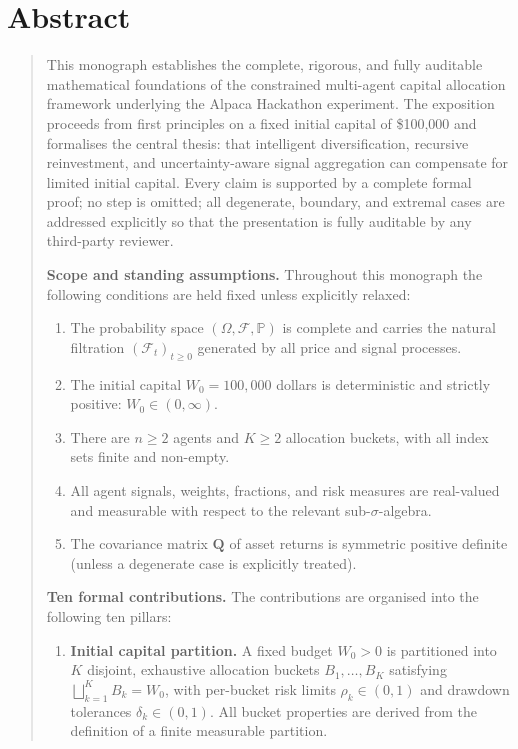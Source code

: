 \documentclass[12pt,openany]{book}
\newcommand{\bfQ}{\mathbf{Q}}
\numberwithin{equation}{chapter}
\theoremstyle{plain}
\theoremstyle{definition}
\theoremstyle{remark}
\newenvironment{abstract}{%
  \chapter*{Abstract}
  \begin{quote}\small
}{%
  \end{quote}
}
\numberwithin{equation}{chapter}
\theoremstyle{plain}
\begin{document}
\begin{abstract}
This monograph establishes the complete, rigorous, and fully
auditable mathematical foundations of the constrained multi-agent
capital allocation framework underlying the Alpaca Hackathon
experiment.  The exposition proceeds from first principles on a
fixed initial capital of \$100{,}000 and formalises the central
thesis: that intelligent diversification, recursive reinvestment,
and uncertainty-aware signal aggregation can compensate for limited
initial capital.  Every claim is supported by a complete formal proof;
no step is omitted; all degenerate, boundary, and extremal cases are
addressed explicitly so that the presentation is fully auditable by
any third-party reviewer.

\medskip
\noindent
\textbf{Scope and standing assumptions.}\enspace
Throughout this monograph the following conditions are held fixed
unless explicitly relaxed:
\begin{enumerate}[label=(\roman*), leftmargin=2.5em,
                  itemsep=2pt, parsep=0pt, topsep=3pt]
  \item The probability space $(\Omega,\mathcal{F},\mathbb{P})$ is
        complete and carries the natural filtration
        $(\mathcal{F}_t)_{t\ge 0}$ generated by all price and
        signal processes.
  \item The initial capital $W_0 = 100{,}000$ dollars is deterministic
        and strictly positive: $W_0 \in (0,\infty)$.
  \item There are $n \ge 2$ agents and $K \ge 2$ allocation buckets,
        with all index sets finite and non-empty.
  \item All agent signals, weights, fractions, and risk measures are
        real-valued and measurable with respect to the relevant
        sub-$\sigma$-algebra.
  \item The covariance matrix $\bfQ$ of asset returns is symmetric
        positive definite (unless a degenerate case is
        explicitly treated).
\end{enumerate}

\medskip
\noindent
\textbf{Ten formal contributions.}\enspace
The contributions are organised into the following ten pillars:

\begin{enumerate}[label=\textbf{\arabic*.}, leftmargin=2em,
                  itemsep=4pt, parsep=0pt, topsep=4pt]

  \item \textbf{Initial capital partition.}\enspace
        A fixed budget $W_0 > 0$ is partitioned into $K$ disjoint,
        exhaustive allocation buckets $B_1,\ldots,B_K$ satisfying
        $\bigsqcup_{k=1}^{K} B_k = W_0$, with per-bucket risk
        limits $\rho_k \in (0,1)$ and drawdown tolerances
        $\delta_k \in (0,1)$.  All bucket properties are derived
        from the definition of a finite measurable partition.


\end{enumerate}
\end{abstract}
\end{document}
